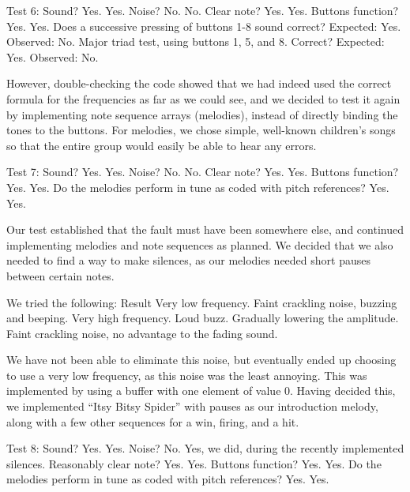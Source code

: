 Test 6:
Sound? Yes. Yes.
Noise? No. No.
Clear note? Yes. Yes.
Buttons function? Yes. Yes.
Does a successive pressing of buttons 1-8 sound correct? Expected: Yes. Observed: No.
Major triad test, using buttons 1, 5, and 8. Correct? Expected: Yes. Observed: No.

However, double-checking the code showed that we had indeed used the correct formula for the frequencies as far as we could see, and we decided to test it again by implementing note sequence arrays (melodies), instead of directly binding the tones to the buttons. For melodies, we chose simple, well-known children's songs so that the entire group would easily be able to hear any errors.

Test 7:
Sound? Yes. Yes.
Noise? No. No.
Clear note? Yes. Yes.
Buttons function? Yes. Yes.
Do the melodies perform in tune as coded with pitch references? Yes. Yes.

Our test established that the fault must have been somewhere else, and continued implementing melodies and note sequences as planned. We decided that we also needed to find a way to make silences, as our melodies needed short pauses between certain notes.

We tried the following:					Result
Very low frequency.						Faint crackling noise, buzzing and beeping.
Very high frequency.					Loud buzz.
Gradually lowering the amplitude.		Faint crackling noise, no advantage to the fading sound.

We have not been able to eliminate this noise, but eventually ended up choosing to use a very low frequency, as this noise was the least annoying. This was implemented by using a buffer with one element of value 0. Having decided this, we implemented ``Itsy Bitsy Spider'' with pauses as our introduction melody, along with a few other sequences for a win, firing, and a hit.

Test 8:
Sound? Yes. Yes.
Noise? No. Yes, we did, during the recently implemented silences.
Reasonably clear note? Yes. Yes.
Buttons function? Yes. Yes.
Do the melodies perform in tune as coded with pitch references? Yes. Yes.
